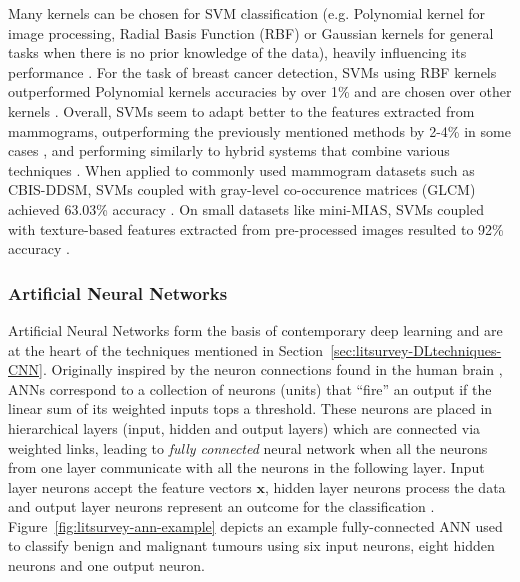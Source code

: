 Many kernels can be chosen for SVM classification (e.g. Polynomial kernel for image processing, Radial Basis Function (RBF) or Gaussian kernels for general tasks when there is no prior knowledge of the data), heavily influencing its performance \citep{amari1999improving}. For the task of breast cancer detection, SVMs using RBF kernels outperformed Polynomial kernels accuracies by over 1\% \citep{Osareh2010} and are chosen over other kernels \citep{Asri2016}. Overall, SVMs seem to  adapt better to the features extracted from mammograms, outperforming the previously mentioned methods by  2-4\% in some cases \citep{Asri2016}, and performing similarly to hybrid systems that combine various techniques \citep{Yue2018}. When applied to commonly used mammogram datasets such as CBIS-DDSM, SVMs coupled with gray-level co-occurence matrices (GLCM) achieved 63.03\% accuracy \citep{Sarosa2018}. On small datasets like  mini-MIAS, SVMs coupled with texture-based features extracted from pre-processed images resulted to 92\% accuracy \citep{Vishrutha2014}.

\subsubsection{Artificial Neural Networks}
\label{sec:litsurvey-anns}

Artificial Neural Networks form the basis of contemporary deep learning and are at the heart of the techniques mentioned in Section~\ref{sec:litsurvey-DLtechniques-CNN}. Originally inspired by the neuron connections found in the human brain \citep{mcculloch1943logical}, ANNs correspond to a collection of neurons (units) that ``fire'' an output if the linear sum of its weighted inputs tops a threshold. These neurons are placed in hierarchical layers (input, hidden and output layers) which are connected via weighted links, leading to \textit{fully connected} neural network when all the neurons from one layer communicate with all the neurons in the following layer. Input layer neurons accept the feature vectors $\textbf{x}$, hidden layer neurons process the data and output layer neurons represent an outcome for the classification \citep{russell2002artificial}. Figure~\ref{fig:litsurvey-ann-example} depicts an example fully-connected ANN used to classify benign and malignant tumours using six input neurons, eight hidden neurons and one output neuron.\\

